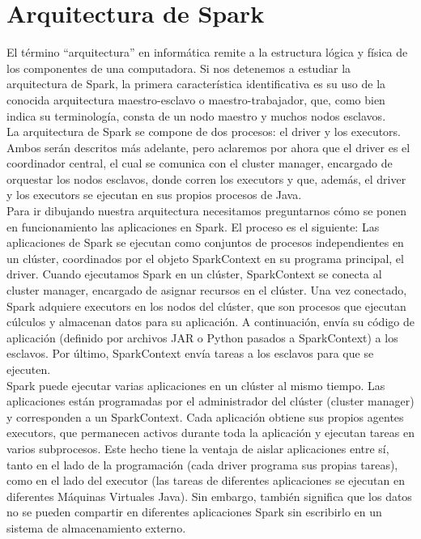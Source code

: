 \chapter{Arquitectura de Spark}

El término “arquitectura” en informática remite a la estructura lógica y física de los componentes de una computadora. Si nos detenemos a estudiar la arquitectura de Spark, la primera característica identificativa es su uso de la conocida arquitectura maestro-esclavo o maestro-trabajador, que, como bien indica su terminología, consta de un nodo maestro y muchos nodos esclavos.\\

La arquitectura de Spark se compone de dos procesos: el driver y los executors. Ambos serán descritos más adelante, pero aclaremos por ahora que el driver es el coordinador central, el cual se comunica con el cluster manager, encargado de orquestar los nodos esclavos, donde corren los executors y que, además, el driver y los executors se ejecutan en sus propios procesos de Java.\\

Para ir dibujando nuestra arquitectura necesitamos preguntarnos cómo se ponen en funcionamiento las aplicaciones en Spark. El proceso es el siguiente: Las aplicaciones de Spark se ejecutan como conjuntos de procesos independientes en un clúster, coordinados por el objeto SparkContext en su programa principal, el driver. Cuando ejecutamos Spark en un clúster, SparkContext se conecta al cluster manager, encargado de asignar recursos en el clúster. Una vez conectado, Spark adquiere executors en los nodos del clúster, que son procesos que ejecutan cúlculos y almacenan datos para su aplicación. A continuación, envía su código de aplicación (definido por archivos JAR o Python pasados a SparkContext) a los esclavos. Por último, SparkContext envía tareas a los esclavos para que se ejecuten.\\

Spark puede ejecutar varias aplicaciones en un clúster al mismo tiempo. Las aplicaciones están programadas por el administrador del clúster (cluster manager) y corresponden a un SparkContext. Cada aplicación obtiene sus propios agentes executors, que permanecen activos durante toda la aplicación y ejecutan tareas en varios subprocesos. Este hecho tiene la ventaja de aislar aplicaciones entre sí, tanto en el lado de la programación (cada driver programa sus propias tareas), como en el lado del executor (las tareas de diferentes aplicaciones se ejecutan en diferentes Máquinas Virtuales Java). Sin embargo, también significa que los datos no se pueden compartir en diferentes aplicaciones Spark sin escribirlo en un sistema de almacenamiento externo.\\

